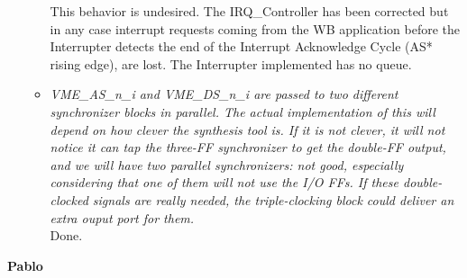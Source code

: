 \documentclass[a4paper,11pt]{article}
\begin{document}
\begin{itemize}
\begin{itemize}
This behavior is undesired. The IRQ\_Controller has been corrected
but in any case interrupt requests coming from the WB application before the Interrupter detects the end of the Interrupt Acknowledge Cycle (AS* rising edge), are lost. 
The Interrupter implemented has no queue.

\item \textit{VME\_AS\_n\_i and VME\_DS\_n\_i are passed to two different synchronizer
blocks in parallel. The actual implementation of this will depend on
how clever the synthesis tool is. If it is not clever, it will not
notice it can tap the three-FF synchronizer to get the double-FF
output, and we will have two parallel synchronizers: not good,
especially considering that one of them will not use the I/O FFs. If
these double-clocked signals are really needed, the triple-clocking
block could deliver an extra ouput port for them.}\\

Done.

\end{itemize}
\end{itemize}
\newpage
\begin{center}
\LARGE{\textbf{Pablo}}
\end{center}
\end{document}
